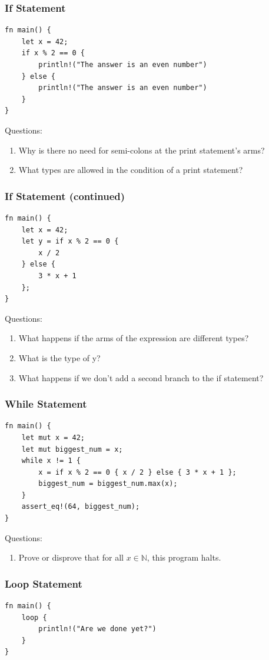\documentclass{slides}
\begin{document}
\begin{frame}[fragile]
\frametitle{If Statement}
\begin{verbatim}
fn main() {
    let x = 42; 
    if x % 2 == 0 {
        println!("The answer is an even number")
    } else {
        println!("The answer is an even number")
    }
}
\end{verbatim}
Questions:
\begin{enumerate}
    \item Why is there no need for semi-colons at the print statement's arms?
    \item What types are allowed in the condition of a print statement?
\end{enumerate}
\end{frame}

\begin{frame}[fragile]
\frametitle{If Statement (continued)}
\begin{verbatim}
fn main() {
    let x = 42; 
    let y = if x % 2 == 0 {
        x / 2
    } else {
        3 * x + 1
    };
}
\end{verbatim}
Questions:
\begin{enumerate}
    \item What happens if the arms of the expression are different types?
    \item What is the type of y?
    \item What happens if we don't add a second branch to the if statement?
\end{enumerate}
\end{frame}

\begin{frame}[fragile]
\frametitle{While Statement}
\begin{verbatim}
fn main() {
    let mut x = 42;
    let mut biggest_num = x;
    while x != 1 {
        x = if x % 2 == 0 { x / 2 } else { 3 * x + 1 };
        biggest_num = biggest_num.max(x);
    }
    assert_eq!(64, biggest_num);
}
\end{verbatim}
Questions:
\begin{enumerate}
    \item Prove or disprove that for all $x \in \mathbb{N}$, this program halts.
\end{enumerate}
\end{frame}

\begin{frame}[fragile]
\frametitle{Loop Statement}
\begin{verbatim}
fn main() {
    loop {
        println!("Are we done yet?")
    }
}
\end{verbatim}
\end{frame}
\end{document}
